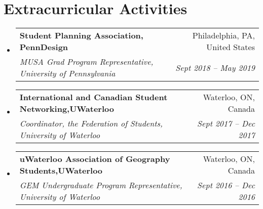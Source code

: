 \documentclass[letterpaper,11pt]{article}
\makeatletter
\newcommand{\resumeSubheading}[4]{
  \vspace{-1pt}\item
    \begin{tabular*}{0.97\textwidth}{l@{\extracolsep{\fill}}r}
      \textbf{#1} & #2 \\
      \textit{\small#3} & \textit{\small #4} \\
    \end{tabular*}\vspace{-5pt}
}
\newcommand{\resumeSubHeadingListStart}{\begin{itemize}[leftmargin=*]}
\newcommand{\resumeSubHeadingListEnd}{\end{itemize}}
\makeatother
\begin{document}
\section{Extracurricular Activities}
  \resumeSubHeadingListStart
  
       \resumeSubheading
      {Student Planning Association, PennDesign}{Philadelphia, PA, United States}
      {MUSA Grad Program Representative, University of Pennsylvania}{Sept 2018 -- May 2019}
      
         \resumeSubheading
      {International and Canadian Student Networking,UWaterloo}{Waterloo, ON, Canada}
      {Coordinator, the Federation of Students, University of Waterloo}{Sept 2017 -- Dec 2017}
      
        \resumeSubheading
      {uWaterloo Association of Geography Students,UWaterloo}{Waterloo, ON, Canada}
      {GEM Undergraduate Program Representative, University of Waterloo}{Sept 2016 -- Dec 2016}
\resumeSubHeadingListEnd



\end{document}
